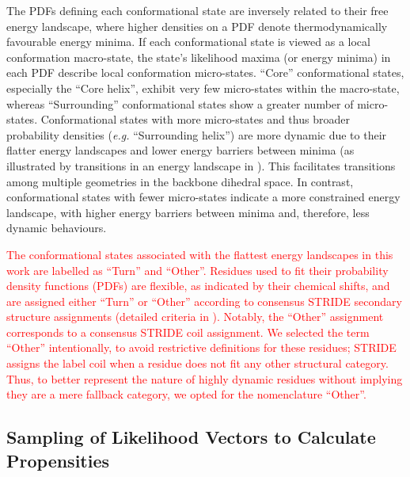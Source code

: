 The PDFs defining each conformational state are inversely related to their free energy landscape, where higher densities on a PDF denote thermodynamically favourable energy minima. If each conformational state is viewed as a local conformation macro-state, the state's likelihood maxima (or energy minima) in each PDF describe local conformation micro-states. ``Core'' conformational states, especially the ``Core helix'', exhibit very few micro-states within the macro-state, whereas ``Surrounding'' conformational states show a greater number of micro-states. Conformational states with more micro-states and thus broader probability densities (\textit{e.g.} ``Surrounding helix'') are more dynamic due to their flatter energy landscapes and lower energy barriers between minima (as illustrated by transitions in an energy landscape in ). This facilitates transitions among multiple geometries in the backbone dihedral space. In contrast, conformational states with fewer micro-states indicate a more constrained energy landscape, with higher energy barriers between minima and, therefore, less dynamic behaviours. 

\textcolor{red}{The conformational states associated with the flattest energy landscapes in this work are labelled as ``Turn'' and ``Other''. Residues used to fit their probability density functions (PDFs) are flexible, as indicated by their chemical shifts, and are assigned either ``Turn'' or ``Other'' according to consensus STRIDE secondary structure assignments (detailed criteria in ). Notably, the ``Other'' assignment corresponds to a consensus STRIDE coil assignment. We selected the term ``Other'' intentionally, to avoid restrictive definitions for these residues; STRIDE assigns the label coil when a residue does not fit any other structural category. Thus, to better represent the nature of highly dynamic residues without implying they are a mere fallback category, we opted for the nomenclature ``Other''.}


\subsection{Sampling of Likelihood Vectors to Calculate Propensities}

